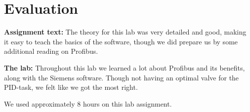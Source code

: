 \newpage
\section{Evaluation}

\textbf{Assignment text:}
The theory for this lab was very detailed and good, making it easy to teach the basics of the software, though we did prepare us by some additional reading on Profibus.

\textbf{The lab:}
Throughout this lab we learned a lot about Profibus and its benefits, along with the Siemens software. Though not having an optimal valve for the PID-task, we felt like we got the most right.

We used approximately 8 hours on this lab assignment.

